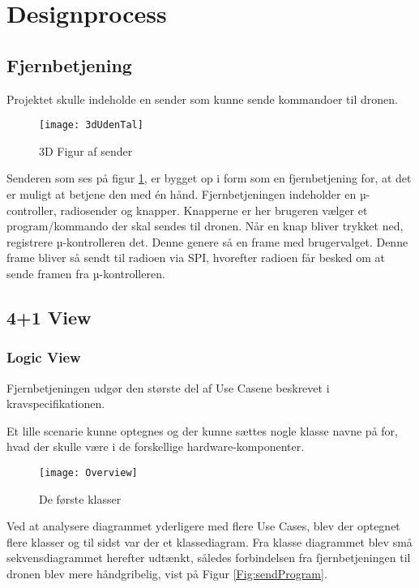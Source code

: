 \documentclass[Main]{subfiles}
\begin{document}
\section{Designprocess}

\subsection{Fjernbetjening}

Projektet skulle indeholde en sender som kunne sende kommandoer til dronen.

\begin{figure}[H]
\centering
\texttt{[image: 3dUdenTal]}
\caption{3D Figur af sender}
\label{Fig:3dUdenTal}
\end{figure}


Senderen som ses på figur \ref{Fig:3dUdenTal}, er bygget op i form som en fjernbetjening for, at det er muligt at betjene den med én hånd.
Fjernbetjeningen indeholder en µ-controller, radiosender og knapper.
Knapperne er her brugeren vælger et program/kommando der skal sendes til dronen. Når en knap bliver trykket ned, registrere µ-kontrolleren det. Denne genere så en frame med brugervalget. Denne frame bliver så sendt til radioen via SPI, hvorefter radioen får besked om at sende framen fra µ-kontrolleren.

\subsection{4+1 View}


\subsubsection*{Logic View}

Fjernbetjeningen udgør den største del af Use Casene beskrevet i kravspecifikationen\cite[s. 7 -- 11]{Kravspec}.

Et lille scenarie kunne optegnes og der kunne sættes nogle klasse navne på for, hvad der skulle være i de forskellige hardware-komponenter.

\begin{figure}[H]
\centering
\texttt{[image: Overview]}
\caption{De første klasser}
\label{Fig:Overview}
\end{figure}


Ved at analysere diagrammet yderligere med flere Use Cases, blev der optegnet flere klasser og til sidst var der et klassediagram. 
Fra klasse diagrammet blev små sekvensdiagrammet herefter udtænkt, således forbindelsen fra fjernbetjeningen til dronen blev mere håndgribelig, vist på Figur \ref{Fig:sendProgram}.
\end{document}
